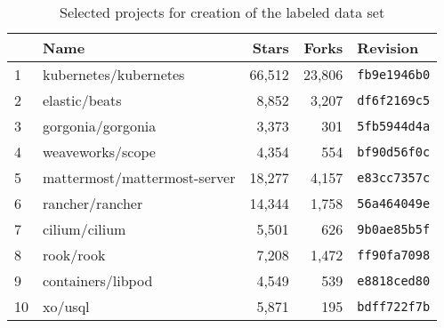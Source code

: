 \begin{table}[!t]
    \centering
    \caption{Selected projects for creation of the labeled data set}
    \label{tbl:dataset-projects}
    \begin{adjustbox}{max width=0.48\textwidth}
    \begin{tabular}{llrrl}
        \hline
        {} &                          Name &  Stars &  Forks &    Revision \\ \hline
        1  &         kubernetes/kubernetes &  66,512 &  23,806 &  \texttt{fb9e1946b0} \\
        2  &                 elastic/beats &   8,852 &   3,207 &  \texttt{df6f2169c5} \\
        3  &             gorgonia/gorgonia &   3,373 &    301 &  \texttt{5fb5944d4a} \\
        4  &              weaveworks/scope &   4,354 &    554 &  \texttt{bf90d56f0c} \\
        5  &  mattermost/mattermost-server &  18,277 &   4,157 &  \texttt{e83cc7357c} \\
        6  &               rancher/rancher &  14,344 &   1,758 &  \texttt{56a464049e} \\
        7  &                 cilium/cilium &   5,501 &    626 &  \texttt{9b0ae85b5f} \\
        8  &                     rook/rook &   7,208 &   1,472 &  \texttt{ff90fa7098} \\
        9  &             containers/libpod &   4,549 &    539 &  \texttt{e8818ced80} \\
        10 &                       xo/usql &   5,871 &    195 &  \texttt{bdff722f7b} \\ \hline
    \end{tabular}
    \end{adjustbox}
\end{table}